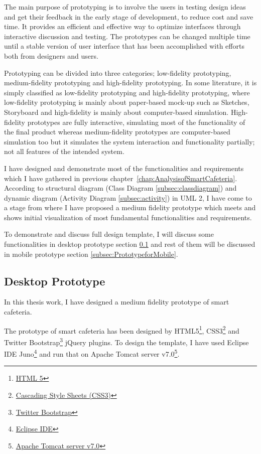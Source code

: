 The main purpose of prototyping is to involve the users in testing design ideas
and get their feedback in the early stage of development, to reduce cost and
save time. It provides an efficient and effective way to optimize interfaces
through interactive discussion and testing. The prototypes can be changed
multiple time until a stable version of user interface that has been
accomplished with efforts both from designers and users.

Prototyping can be divided into three categories; low-fidelity prototyping,
medium-fidelity prototyping and high-fidelity prototyping. In some literature,
it is simply classified as low-fidelity prototyping and high-fidelity
prototyping, where low-fidelity prototyping is mainly about paper-based mock-up
such as Sketches, Storyboard and high-fidelity is mainly about computer-based
simulation. High-fidelity prototypes are fully interactive, simulating most of
the functionality of the final product whereas medium-fidelity prototypes are
computer-based simulation too but it simulates the system interaction and
functionality partially; not all features of the intended system.


I have designed and demonstrate most of the functionalities and requirements
which I have gathered in previous chapter~\ref{chap:AnalysisofSmartCafeteria}.
According to structural diagram (Class Diagram \ref{subsec:classdiagram}) and
dynamic diagram (Activity Diagram \ref{subsec:activity}) in UML 2, I have come
to a stage from where I have proposed a medium fidelity prototype which meets
and shows initial visualization of most fundamental functionalities and
requirements.

To demonstrate and discuss full design template, I will discuss some
functionalities in desktop prototype section \ref{subsec:prototypefordesktop}
and rest of them will be discussed in mobile prototype section
\ref{subsec:PrototypeforMobile}.

\subsection{Desktop Prototype}
\label{subsec:prototypefordesktop}
In this thesis work, I have designed a medium fidelity prototype of smart
cafeteria.


The prototype of smart cafeteria has been designed by
HTML5\footnote{\href{http://www.w3.org/TR/html51/}{HTML 5}},
CSS3\footnote{\href{http://www.w3.org/TR/CSS/}{Cascading Style Sheets (CSS3)}}
and Twitter
Bootstrap\footnote{\href{http://twitter.github.io/bootstrap/}{Twitter
Bootstrap}} jQuery plugins.  To design the template, I have used Eclipse IDE
Juno\footnote{\href{http://twitter.github.io/bootstrap/}{Eclipse IDE}} and run
that on Apache Tomcat server
v7.0\footnote{\href{http://tomcat.apache.org/}{Apache Tomcat server v7.0}}.


